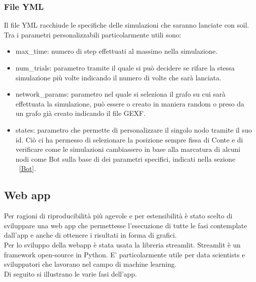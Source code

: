         \subsubsection{File YML}
        Il file YML racchiude le specifiche delle simulazioni che saranno lanciate con soil.\\
        Tra i parametri personalizzabili particolarmente utili sono:
        \begin{itemize}
          \item max_time: numero di step effettuati al massimo nella simulazione.
          \item num_trials: parametro tramite il quale si può decidere se rifare la stessa simulazione più volte indicando il numero di volte che sarà lanciata.
          \item network_params: parametro nel quale si seleziona il grafo su cui sarà effettuata la simulazione, può essere o creato in maniera random o preso da un grafo già creato indicando il file GEXF.
          \item states: parametro che permette di personalizzare il singolo nodo tramite il suo id. Ciò ci ha permesso di selezionare la posizione sempre fissa di Conte e di verificare come le simulazioni cambiassero in base alla marcatura di alcuni nodi come Bot sulla base di dei parametri specifici, indicati nella sezione ~\ref{Bot}.
        \end{itemize}

    \subsection{Web app}
      Per ragioni di riproducibilità più agevole e per estensibilità è stato scelto di sviluppare una web app che permettesse l’esecuzione di tutte le fasi contemplate dall’app e anche di ottenere i risultati in forma di grafici.\\
      Per lo sviluppo della webapp è stata usata la libreria streamlit. Streamlit è un framework open-source in Python. E’ particolarmente utile per data scientists e sviluppatori che lavorano nel campo di machine learning.\\

      Di seguito si illustrano le varie fasi dell’app.
